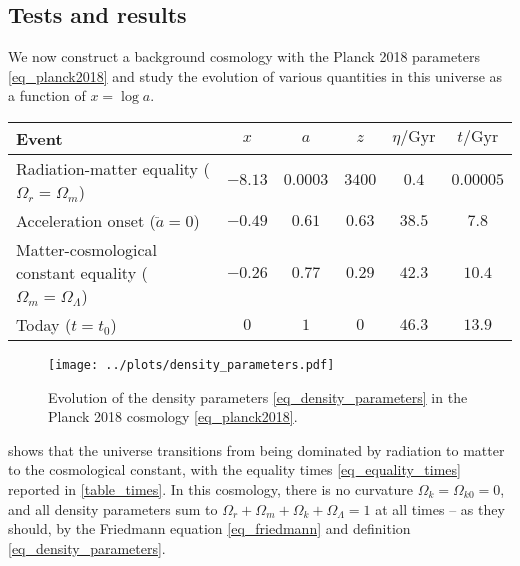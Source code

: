 \documentclass[10pt,a4paper]{article}
\begin{document}
\subsection{Tests and results}

We now construct a background cosmology with the Planck 2018 parameters \eqref{eq_planck2018}
and study the evolution of various quantities in this universe as a function of $x = \log a$.

\begin{table*}
\centering
\caption{%
	The time of occurence of four important events in the evolution of a universe with the Planck cosmology \eqref{eq_planck2018},
	expressed in terms of the scale factor $a$, its natural logarithm $x = \log a$, redshift $z = \frac1a - 1$, cosmic time $t$ and conformal time $\eta$.
}
\label{table_times}
\begin{tabular}{l c c c c c}
	\toprule
	Event                                                               & $x$     & $a$       & $z$    & $\eta / \mathrm{Gyr}$    & $t / \mathrm{Gyr}$ \\
	\midrule
	Radiation-matter equality ($\Omega_r = \Omega_m$)                   & $-8.13$ & $0.0003$  & $3400$ & $0.4$ & $0.00005$ \\
	Acceleration onset ($\ddot{a} = 0$)                                 & $-0.49$ & $0.61$    & $0.63$ & $38.5$ & $7.8$   \\
	Matter-cosmological constant equality ($\Omega_m = \Omega_\Lambda$) & $-0.26$ & $0.77$    & $0.29$ & $42.3$ & $10.4$  \\
	Today ($t = t_0$)                                                   & $0$     & $1$       & $0$    & $46.3$ & $13.9$  \\
	\bottomrule
\end{tabular}
\end{table*}

\begin{figure}
	\centering
	\texttt{[image: ../plots/density\_parameters.pdf]}
\caption{Evolution of the density parameters \eqref{eq_density_parameters} in the Planck 2018 cosmology \eqref{eq_planck2018}.}
\label{fig_density_parameters}
\end{figure}

 shows that the universe
transitions from being dominated by radiation to matter to the cosmological constant,
with the equality times \eqref{eq_equality_times} reported in \cref{table_times}.
In this cosmology, there is no curvature $\Omega_{k} = \Omega_{k0} = 0$,
and all density parameters sum to $\Omega_{r} + \Omega_m + \Omega_k + \Omega_\Lambda = 1$ at all times -- as they should, by the Friedmann equation \eqref{eq_friedmann} and definition \eqref{eq_density_parameters}.
\end{document}
